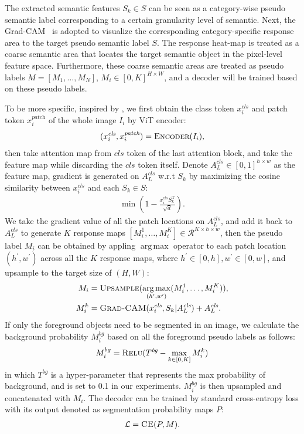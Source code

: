 \documentclass[runningheads]{llncs}
\DeclareMathOperator*{\argmax}{arg\,max}
\begin{document}
The extracted semantic features $S_k \in S$ can be seen as a category-wise pseudo semantic label corresponding to a certain granularity level of semantic. Next, the Grad-CAM~\cite{selvaraju2017gradcam} is adopted to visualize the corresponding category-specific response area to the target pseudo semantic label $S$. The response heat-map is treated as a coarse semantic area that locates the target semantic object in the pixel-level feature space. Furthermore, these coarse semantic areas are treated as pseudo labels $M = [M_1, \dots, M_N]$, $M_i \in [0, K]^{H \times W}$, and a decoder will be trained based on these pseudo labels.


To be more specific, inspired by \cite{chefer2021TransformerExplainability}, we first obtain the class token $x_i^{\textit{cls}}$ and patch token $x_i^\textit{patch}$ of the whole image $I_i$ by ViT encoder:
\begin{align}
    (x^{\textit{cls}}_i, x^{\textit{patch}}_{i}) = \Call{Encoder}{I_i},
\end{align}
then take attention map from $\textit{cls}$ token of the last attention block, and take the feature map while discarding the $\textit{cls}$ token itself. Denote $A_L^{\textit{cls}} \in [0, 1]^{h \times w}$ as the feature map,  gradient is generated on $A_L^{\textit{cls}}$ w.r.t $S_k$ by maximizing the cosine similarity between $x_i^{\textit{cls}}$ and each $S_k \in S$:
\begin{align}
    \min (1 - \frac{x_i^{\textit{cls}}S_k^\mathrm{T}}{\sqrt{d}}).
\end{align}
We take the gradient value of all the patch locations on $A_L^{\textit{cls}}$, and add it back to $A_L^{\textit{cls}}$ to generate $K$ response maps $[M_i^1, \dots, M_i^K] \in \mathcal{R}^{K \times h \times w}$, then the pseudo label $M_i$ can be obtained by appling $\argmax$ operator to each patch location $(h^{\prime}, w^{\prime})$ across all the $K$ response maps, where $h^{\prime} \in [0, h], w^{\prime} \in [0, w]$, and upsample to the target size of $(H, W)$:
\begin{align}
    M_i &= \Call{Upsample}{\argmax_{(h^{\prime}, w^{\prime})} (M_i^1, \dots, M_i^K)} , \\
    M_{i}^{k} &= \Call{Grad-CAM}{x_i^{\textit{cls}}, S_k | A_L^{\textit{cls}}} + A_L^{\textit{cls}}.
\end{align}
If only the foreground objects need to be segmented in an image, we calculate the background probability  $M_i^{bg}$ based on all the foreground pseudo labels as follows:
\begin{align}
    M_i^{bg} = \Call{Relu}{T^{\textit{bg}} - \max_{k \in [0, K]}{M_i^k}}
    \label{eq:prob_bg}
\end{align}
in which $T^{\textit{bg}}$ is a hyper-parameter that represents the max probability of background, and is set to 0.1 in our experiments. $M_i^{\textit{bg}}$ is then upsampled and concatenated with $M_i$. 
The decoder can be trained by standard cross-entropy loss with its output denoted as segmentation probability maps $P$:
\begin{align}
    \mathcal{L} = \Call{CE}{P, M}.
    \label{eq:loss:ce}
\end{align}
\end{document}
